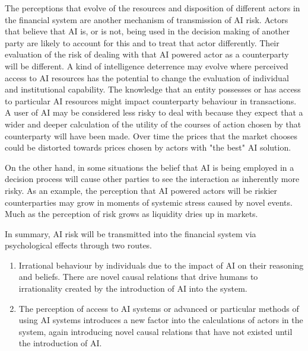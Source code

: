 \documentclass[11pt]{article}
\begin{document}
 The perceptions that evolve of the resources and disposition of different actors in the financial system are another mechanism of transmission of AI risk. Actors that believe that AI is, or is not, being used in the decision making of another party are likely to account for this and to treat that actor differently. Their evaluation of the risk of dealing with that AI powered actor as a counterparty will be different. A kind of intelligence deterrence may evolve where perceived access to AI resources has the potential to change the evaluation of individual and institutional capability. The knowledge that an entity possesses or has access to particular AI resources might impact counterparty behaviour in transactions. A user of AI may be considered less risky to deal with because they expect that a wider and deeper calculation of the utility of the courses of action chosen by that counterparty will have been made. Over time the prices that the market chooses could be distorted towards prices chosen by actors with "the best" AI solution. 

On the other hand, in some situations the belief that AI is being employed in a decision process will cause other parties to see the interaction as inherently more risky. As an example, the perception that AI powered actors will be riskier counterparties may grow in moments of systemic stress caused by novel events. Much as the perception of risk grows as liquidity dries up in markets. 

In summary, AI risk will be transmitted into the financial system via psychological effects through two routes.
\begin{enumerate}
\item Irrational behaviour by individuals due to the impact of AI on their reasoning and beliefs. There are novel causal relations that drive humans to irrationality created by the introduction of AI into the system.
\item The perception of access to AI systems or advanced or particular methods of using AI systems introduces a new factor into the calculations of actors in the system, again introducing novel causal relations that have not existed until the introduction of AI. 
\end{enumerate}
\end{document}
